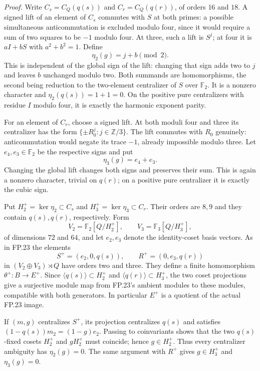 \emph{Proof.}
Write $C_s=C_Q(q(s))$ and $C_r=C_Q(q(r))$, of orders $16$ and
$18$.  A signed lift of an element of $C_s$ commutes with $S$
at both primes: a possible simultaneous anticommutation is
excluded modulo four, since it would require a sum of two
squares to be $-1$ modulo four.  At three, such a lift is
$S^j$; at four it is $aI+bS$ with $a^2+b^2=1$.
Define
\[
 \eta_2(g)=j+b\pmod2.
\]
This is independent of the global sign of the lift: changing that
sign adds two to $j$ and leaves $b$ unchanged modulo two.
Both summands are homomorphisms, the second being reduction to
the two-element centralizer of $S$ over $\mathbb F_2$.
It is a nonzero character and $\eta_2(q(s))=1+1=0$.
On the positive pure centralizers with residue $I$ modulo four,
it is exactly the harmonic exponent parity.

For an element of $C_r$, choose a signed lift.  At both moduli
four and three its centralizer has the form
$\{\pm R_0^j: j\in\mathbb Z/3\}$.
The lift commutes with $R_0$ genuinely: anticommutation would
negate its trace $-1$, already impossible modulo three.
Let $e_4,e_3\in\mathbb F_2$ be the respective signs and put
\[
 \eta_3(g)=e_4+e_3.
\]
Changing the global lift changes both signs and preserves their
sum.  This is again a nonzero character, trivial on $q(r)$;
on a positive pure centralizer it is exactly the cubic sign.

Put $H_2^+=\ker\eta_2\subset C_s$ and
$H_3^+=\ker\eta_3\subset C_r$.  Their orders are $8,9$ and
they contain $q(s),q(r)$, respectively.  Form
\[
 V_2=\mathbb F_2[Q/H_2^+],\qquad
 V_3=\mathbb F_3[Q/H_3^+],
\]
of dimensions $72$ and $64$, and let $e_2,e_3$ denote the
identity-coset basis vectors.  As in FP.23 the elements
\[
 S^+=(e_2,0,q(s)),\qquad R^+=(0,e_3,q(r))
\]
in $(V_2\oplus V_3)\rtimes Q$ have orders two and three.
They define a finite homomorphism $\theta^+:B\to E^+$.
Since $\langle q(s)\rangle\subset H_2^+$ and
$\langle q(r)\rangle\subset H_3^+$, the two coset projections
give a surjective module map from FP.23's ambient modules to
these modules, compatible with both generators.  In particular
$E^+$ is a quotient of the actual FP.23 image.

If $(m,g)$ centralizes $S^+$, its projection centralizes $q(s)$
and satisfies $(1-q(s))m_2=(1-g)e_2$.  Passing to coinvariants
shows that the two $q(s)$-fixed cosets $H_2^+$ and $gH_2^+$
must coincide; hence $g\in H_2^+$.  Thus every centralizer
ambiguity has $\eta_2(g)=0$.  The same argument with $R^+$
gives $g\in H_3^+$ and $\eta_3(g)=0$.


